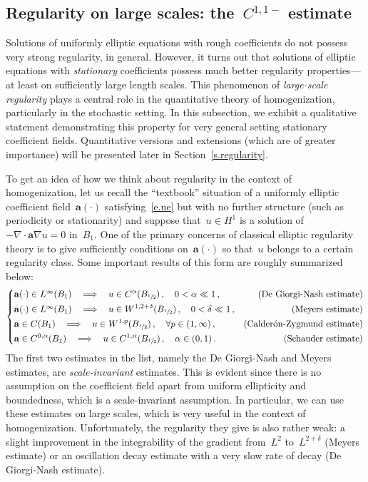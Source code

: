 \documentclass[11pt]{article} %
\numberwithin{equation}{section}
\theoremstyle{definition}
\let\originalleft\left
\let\originalright\right
\renewcommand{\left}{\mathopen{}\mathclose\bgroup\originalleft}
\renewcommand{\right}{\aftergroup\egroup\originalright}
\renewcommand{\a}{\mathbf{a}}
\begin{document}
\subsection{Regularity on large scales: the~\texorpdfstring{$C^{1,1-}$}{{C11-}} estimate}
\label{ss.reg}

Solutions of uniformly elliptic equations with rough coefficients do not possess very strong regularity, in general. However, it turns out that solutions of elliptic equations with \emph{stationary} coefficients possess much better regularity properties---at least on sufficiently large length scales. 
This phenomenon of \emph{large-scale regularity} plays a central role in the quantitative theory of homogenization, particularly in the stochastic setting. 
In this subsection, we exhibit a qualitative statement demonstrating this property for very general setting stationary coefficient fields. Quantitative versions and extensions (which are of greater importance) will be presented later in Section~\ref{s.regularity}.  

\smallskip

To get an idea of how we think about regularity in the context of homogenization, let us recall the ``textbook'' situation of a uniformly elliptic coefficient field~$\a(\cdot)$ satisfying~\eqref{e.ue} but with no further structure (such as periodicity or stationarity) and suppose that~$u\in H^1$ is a solution of~$-\nabla \cdot \a\nabla u = 0$ in~$B_1$. One of the primary concerns of classical elliptic regularity theory is to give sufficiently conditions on~$\a(\cdot)$ so that~$u$ belongs to a certain regularity class. Some important results of this form are roughly summarized below:
\begin{equation}
\label{e.classical.regularity}
\left\{
\begin{aligned}
& 
\mbox{$\a(\cdot)\in L^\infty(B_1) $} 
\ \ \implies \ \
u \in C^{\alpha}(B_{\sfrac12}) 
\,, \quad 0< \alpha \ll 1\,, 
& \mbox{(De Giorgi-Nash estimate)}
\\ & 
\mbox{$\a(\cdot)\in L^\infty(B_1) $} 
\ \ \implies \ \
u \in W^{1,2+\delta} (B_{\sfrac12}) 
\,, \quad 0<\delta \ll 1\,, 
& \mbox{(Meyers estimate)}
\\ & 
\a \in C(B_1) 
\ \ \implies \ \
u \in W^{1,p} (B_{\sfrac12}) 
\,, \quad \forall p\in (1,\infty) \,, 
& \mbox{(Calder\'on-Zygmund estimate)}
\\ & 
\a \in C^{0,\alpha} (B_1)  
\ \ \implies \ \
u \in C^{1,\alpha} (B_{\sfrac12}) 
\,, \quad \alpha\in (0,1) \,.
& \mbox{(Schauder estimate)}
\end{aligned}
\right.
\end{equation}
The first two estimates in the list, namely the De Giorgi-Nash and Meyers estimates, are 
\emph{scale-invariant} estimates. This is evident since there is no assumption on the coefficient field apart from uniform ellipticity and boundedness, which is a scale-invariant assumption. In particular, we can use these estimates on large scales, which is very useful in the context of homogenization. 
Unfortunately, the regularity they give is also rather weak: a slight improvement in the integrability of the gradient from~$L^2$ to~$L^{2+\delta}$ (Meyers estimate) or an oscillation decay estimate with a very slow rate of decay (De Giorgi-Nash estimate). 
\end{document}
